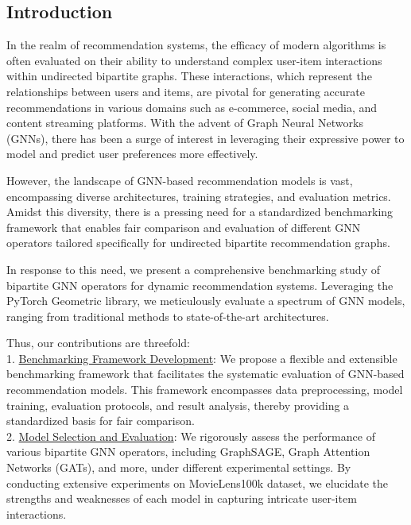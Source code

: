 \documentclass[bst/sn-nature]{sn-jnl}
\begin{document}
\begin{multicols}{2}

\section{Introduction}\label{sec1}

\quad In the realm of recommendation systems, the efficacy of modern algorithms is often evaluated on their ability to understand complex user-item interactions within undirected bipartite graphs. These interactions, which represent the relationships between users and items, are pivotal for generating accurate recommendations in various domains such as e-commerce, social media, and content streaming platforms. With the advent of Graph Neural Networks (GNNs), there has been a surge of interest in leveraging their expressive power to model and predict user preferences more effectively.

However, the landscape of GNN-based recommendation models is vast, encompassing diverse architectures, training strategies, and evaluation metrics. Amidst this diversity, there is a pressing need for a standardized benchmarking framework that enables fair comparison and evaluation of different GNN operators tailored specifically for undirected bipartite recommendation graphs.

In response to this need, we present a comprehensive benchmarking study of bipartite GNN operators for dynamic recommendation systems. Leveraging the PyTorch Geometric library, we meticulously evaluate a spectrum of GNN models, ranging from traditional methods to state-of-the-art architectures.

Thus, our contributions are threefold: \\ 

1. \underline{Benchmarking Framework Development}: We propose a flexible and extensible benchmarking framework that facilitates the systematic evaluation of GNN-based recommendation models. This framework encompasses data preprocessing, model training, evaluation protocols, and result analysis, thereby providing a standardized basis for fair comparison. \\ 

2. \underline{Model Selection and Evaluation}: We rigorously assess the performance of various bipartite GNN operators, including GraphSAGE, Graph Attention Networks (GATs), and more, under different experimental settings. By conducting extensive experiments on MovieLens100k dataset, we elucidate the strengths and weaknesses of each model in capturing intricate user-item interactions. \\ 


\end{multicols}
\end{document}
